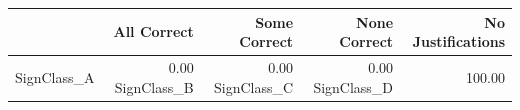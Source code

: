 \begin{tabular}{lrrrr}
\toprule
 & All Correct & Some Correct & None Correct & No Justifications \\
\midrule
SignClass_A & 0.00%
SignClass_B & 0.00%
SignClass_C & 0.00%
SignClass_D & 100.00%
\bottomrule
\end{tabular}

